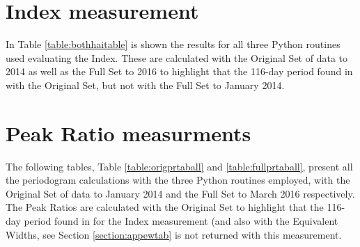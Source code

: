 \section{{\ha} Index measurement}
\protect\label{section:apphaitab}

In Table \ref{table:bothhaitable} is shown the results for all three Python routines used evaluating the {\ha} Index.
These are calculated with the Original Set of data to 2014 as well as the Full Set to 2016 to highlight that the 116-day
period found in \citet{suarezmascareno15} with the Original Set, but not with the Full Set to January 2014.

\begin{table}[!htbp]
\centering
{}
\caption{This table shows the 5 highest peaks from the periodograms for the Original and Full Sets of Data.}
\protect\label{table:bothhaitable}
\end{table}

\section{{\ha} Peak Ratio measurments}
\protect\label{section:appprtab}

The following tables, Table \ref{table:origprtaball} and \ref{table:fullprtaball}, present all the periodogram
calculations with the three Python routines employed, with the Original Set of {\harps} data to January 2014 and the
Full Set to March 2016 respectively. The Peak Ratios are calculated with the Original Set to highlight that the 116-day
period found in \citet{suarezmascareno15} for the {\ha} Index measurement (and also with the Equivalent Widths, see
Section \ref{section:appewtab} is not returned with this measurement.

